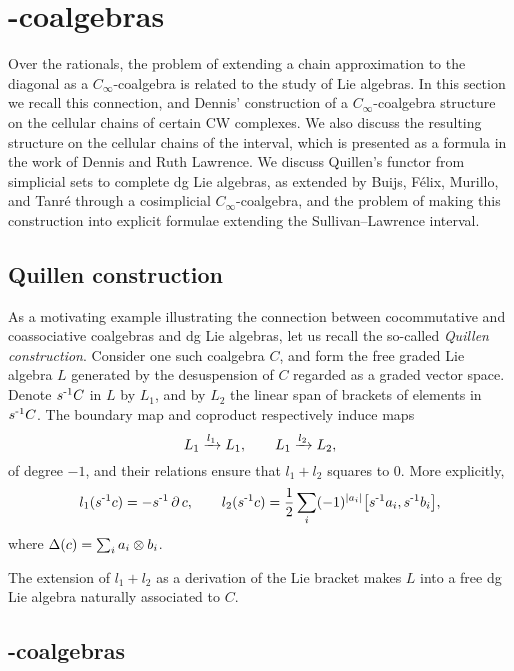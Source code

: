 
\section{\pdfCinfty-coalgebras} \label{s:rationally}

Over the rationals, the problem of extending a chain approximation to the diagonal as a $C_\infty$-coalgebra is related to the study of Lie algebras.
In this section we recall this connection, and Dennis' construction of a $C_\infty$-coalgebra structure on the cellular chains of certain CW complexes.
We also discuss the resulting structure on the cellular chains of the interval, which is presented as a formula in the work of Dennis and Ruth Lawrence.
We discuss Quillen's functor from simplicial sets to complete dg Lie algebras, as extended by Buijs, F{\'e}lix, Murillo, and Tanr{\'e} through a cosimplicial $C_\infty$-coalgebra, and the problem of making this construction into explicit formulae extending the Sullivan--Lawrence interval.

\subsection{Quillen construction}

As a motivating example illustrating the connection between cocommutative and coassociative coalgebras and dg Lie algebras, let us recall the so-called \textit{Quillen construction}.
Consider one such coalgebra $C$, and form the free graded Lie algebra $L$ generated by the desuspension of $C$ regarded as a graded vector space.
Denote $s^{\mbox{\scriptsize -1}}C$ in $L$ by $L_1$, and by $L_2$ the linear span of brackets of elements in $s^{\mbox{\scriptsize -1}}C$.
The boundary map and coproduct respectively induce maps
\[
L_1 \xrightarrow{l_1} L_1,
\qquad
L_1 \xrightarrow{l_2} L_2,
\]
of degree $-1$, and their relations ensure that $l_1 + l_2$ squares to $0$.
More explicitly,
\[
l_1(s^{\mbox{\scriptsize -1}}c) = -s^{\mbox{\scriptsize -1}} \operatorname{\partial} c,
\qquad
l_2(s^{\mbox{\scriptsize -1}}c) = \frac{1}{2} \sum_i (-1)^{\lvert a_i\rvert} \big[ s^{\mbox{\scriptsize -1}}a_i, s^{\mbox{\scriptsize -1}}b_i \big],
\]
where $\Delta(c) = \sum_i a_i \otimes b_i$.

The extension of $l_1 + l_2$ as a derivation of the Lie bracket makes $L$ into a free dg Lie algebra naturally associated to $C$.

\subsection{\pdfCinfty-coalgebras} \label{ss:c-infty definition}

